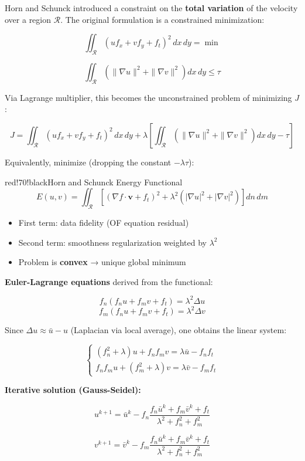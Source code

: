 Horn and Schunck introduced a constraint on the \textbf{total variation} of the velocity over a region $\mathcal{R}$. The original formulation is a constrained minimization:

\[
\iint_{\mathcal{R}} (u f_x + v f_y + f_t)^2 \, dx\, dy = \min
\]

\[
\iint_{\mathcal{R}} \left(\|\nabla u\|^2 + \|\nabla v\|^2\right) dx\, dy \leq \tau
\]

Via Lagrange multiplier, this becomes the unconstrained problem of minimizing $J$:

\[
J = \iint_{\mathcal{R}} (u f_x + v f_y + f_t)^2 \, dx\, dy + \lambda \left[\iint_{\mathcal{R}} \left(\|\nabla u\|^2 + \|\nabla v\|^2\right) dx\, dy - \tau\right]
\]

Equivalently, minimize (dropping the constant $-\lambda\tau$):

\begin{calloutbox}{red!70!black}{Horn and Schunck Energy Functional}
\[
E(u,v) = \iint_{\mathcal{R}} \left[(\nabla f \cdot \mathbf{v} + f_t)^2 + \lambda^2\left(|\nabla u|^2 + |\nabla v|^2\right)\right] dn\, dm
\]
\begin{itemize}
\item First term: data fidelity (OF equation residual)
\item Second term: smoothness regularization weighted by $\lambda^2$
\item Problem is \textbf{convex} → unique global minimum
\end{itemize}
\end{calloutbox}

\textbf{Euler-Lagrange equations} derived from the functional:

\[
f_n(f_n u + f_m v + f_t) = \lambda^2 \Delta u
\]
\[
f_m(f_n u + f_m v + f_t) = \lambda^2 \Delta v
\]

Since $\Delta u \approx \bar{u} - u$ (Laplacian via local average), one obtains the linear system:

\[
\begin{cases} (f_n^2 + \lambda)u + f_n f_m v = \lambda\bar{u} - f_n f_t \\ f_n f_m u + (f_m^2 + \lambda)v = \lambda\bar{v} - f_m f_t \end{cases}
\]

\textbf{Iterative solution (Gauss-Seidel):}

\[
u^{k+1} = \bar{u}^k - f_n \frac{f_n \bar{u}^k + f_m \bar{v}^k + f_t}{\lambda^2 + f_n^2 + f_m^2}
\]

\[
v^{k+1} = \bar{v}^k - f_m \frac{f_n \bar{u}^k + f_m \bar{v}^k + f_t}{\lambda^2 + f_n^2 + f_m^2}
\]

